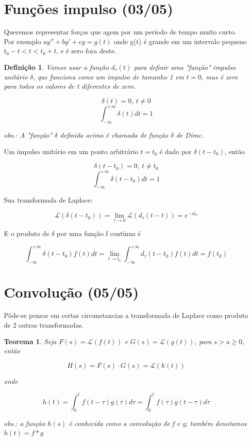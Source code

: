 \documentclass[12pt]{article}
\newtheorem{theorem}{Teorema}[section]
\newtheorem{definition}{Definição}
\begin{document}
\section{Funções impulso (03/05)}
Queremos representar forças que agem por um período de tempo muito curto. Por exemplo $ay'' + by' + c y = g(t)$ onde g(t) é grande em um intervalo pequeno $t_0 - t < t < t_0 + t$, e é zero fora deste. 

\begin{definition}
    Vamos usar a função $d_\tau (t)$ para definir uma "função" impulso unitário $\delta$, que funciona como um impulso de tamanho 1 em $t = 0$, mas é zero para todos os valores de t diferentes de zero.
    
    $$\delta (t) = 0, \ t \neq 0$$
    $$\int_{- \infty}^{+ \infty} \delta (t) d t = 1$$
    
    obs.: A "função" $\delta$ definida acima é chamada de função $\delta$ de Dirac. 
\end{definition}

Um impulso unitário em um ponto arbitrário $t = t_0$ é dado por $\delta (t - t_0)$, então

$$\delta (t - t_0) = 0, \ t \neq t_0$$
$$\int_{- \infty}^{+ \infty} \delta (t - t_0) d t = 1$$

Sua transformada de Laplace:

$$\mathscr{L}(\delta(t - t_0)) = \lim_{\tau \xrightarrow{} 0} \mathscr{L}(d_\tau (t - t)) = e^{- st_0}$$

E o produto de $\delta$ por uma função f contínua é

$$\int_{- \infty}^{+ \infty} \delta (t - t_0) f(t) d t = \lim_{t \xrightarrow{} t_0} \int_{- \infty}^{+ \infty} d_\tau (t - t_0) f(t) d t = f(t_0)$$

\section{Convolução (05/05)}
Pôde-se pensar em certas circunstancias a transformada de Laplace como produto de 2 outras transformadas.

\begin{theorem}
    Seja $F(s) = \mathscr{L}(f(t))$ e $G(s) = \mathscr{L} (g(t))$, para $s > a \geq 0$, então
    
    $$H(s) = F(s) \cdot G(s) = \mathscr{L}(h(t))$$
    
    onde 
    
    $$h(t) = \int_0^t f(t - \tau) g(\tau) d \tau = \int_0^t f(\tau) g(t - \tau) d \tau$$
    
    obs.: a função $h(s)$ é conhecida como a convolução de f e g; também denotamos $h(t) = f * g$
\end{theorem}
\end{document}
